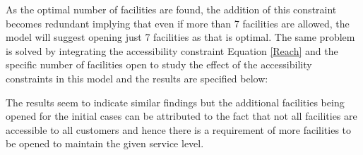 \documentclass[12pt]{article}
\numberwithin{equation}{section}
\begin{document}
As the optimal number of facilities are found, the addition of this constraint becomes redundant implying that even if more than 7 facilities are allowed, the model will suggest opening just 7 facilities as that is optimal. The same problem is solved by integrating the accessibility constraint Equation \ref{Reach} and the specific number of facilities open to study the effect of the accessibility constraints in this model and the results are specified below:
\begin{table}[H]
\centering
\caption{Restricted Facility Opening with Accessibility Constraint}
\end{table}
The results seem to indicate similar findings but the additional facilities being opened for the initial cases can be attributed to the fact that not all facilities are accessible to all customers and hence there is a requirement of more facilities to be opened to maintain the given service level.
\end{document}
